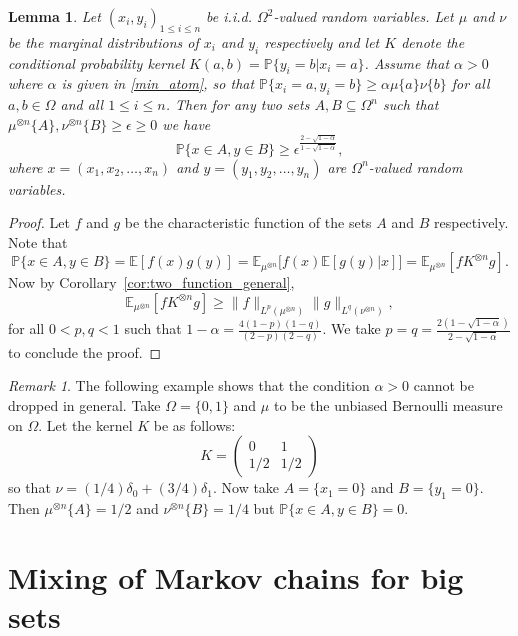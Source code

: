 \documentclass[11pt]{amsart}
\newcommand{\E}{\mathbb{E}}
\newcommand{\PP}{\mathbb{P}}
\newcommand{\eps}{\epsilon}
\newcommand{\1}{\mathbf{1}}
\def\E{{\mathbb E}}
\theoremstyle{definition}
\theoremstyle{plain}
\newtheorem{lemma}[example]{Lemma}
\theoremstyle{remark}
\newtheorem{remark}[example]{Remark}
\numberwithin{equation}{section}
\begin{document}
\begin{lemma} \label{l:corr_sets_noise_cube}
Let $(x_i, y_i)_{1 \le i \le n} $ be i.i.d. $\Omega^2$-valued random variables.  Let $\mu$ and $\nu$ be
the marginal distributions of $x_i$ and $y_i$ respectively and let $K$ denote the conditional probability kernel
$K(a, b) = \PP\{ y_i =b| x_i = a\}$. Assume that $\alpha >0$ where $\alpha$ is given in \eqref{min_atom}, so that
$\PP\{x_{i}=a, y_{i}=b\} \geq \alpha \mu\{a\}\nu\{b\}$ for all $a,b \in \Omega$ and all $1 \leq i \leq n$.
Then for any two sets $A, B \subseteq \Omega^n$ such that $ \mu^{\otimes n}\{ A\}, \nu^{\otimes n}\{ B\} \geq \eps \geq 0$ we have
\begin{equation} \label{eq:two_small}
\PP \{ x \in A, y \in B \} \geq  \eps^{\frac{2- \sqrt{1-\alpha}}{1 - \sqrt{1-\alpha}}},
\end{equation}
where $x = (x_1, x_2, \ldots, x_n)$ and $y = (y_1, y_2, \ldots, y_n)$ are $\Omega^n$-valued random variables.
\end{lemma}


\begin{proof}
Let $f$ and $g$ be the characteristic function of the sets $A$ and $B$ respectively. Note that
\[ \PP\{ x \in A, y \in B\} = \E [f(x) g(y)]  = \E_{\mu^{\otimes n}} \big[ f(x) \E [g(y)| x] \big]=   \E_{\mu^{\otimes n}} [ f K^{\otimes n} g ].\]
Now by Corollary~\ref{cor:two_function_general},
\[ \E_{\mu^{\otimes n}}  [f K^{\otimes n} g] \ge \|f \|_{L^p(\mu^{\otimes n})} \|g \|_{L^q(\nu^{\otimes n})}, \]
for all $0 < p, q<1$ such that $1-\alpha = \frac{4(1-p)(1-q)}{(2-p)(2-q)}$.  We  take $p = q = \frac{2(1-\sqrt{1-\alpha})}{2 - \sqrt{1-\alpha}}$ to conclude the proof.
\end{proof}

\begin{remark}
The following example shows that the condition  $\alpha>0$ cannot be dropped in general. Take $\Omega = \{ 0, 1\}$ and $\mu$ to be the unbiased Bernoulli measure on $\Omega$. Let the kernel $K$ be as follows:
\[ K  = \begin{pmatrix} 0 &1\\ 1/2 & 1/2 \end{pmatrix}\]
so that $\nu=(1/4)\delta_{0} + (3/4) \delta_{1}$. Now take $A = \{x_1 = 0 \}$ and $B = \{ y_1 =0\}$. Then $\mu^{\otimes n}\{ A\} = 1/2$ and $\nu^{\otimes n}\{ B\}  = 1/4$ but $\PP \{ x \in A, y \in B \}=0$.
\end{remark}


\section{Mixing of Markov chains for big sets}\label{sec:mix}
\end{document}

